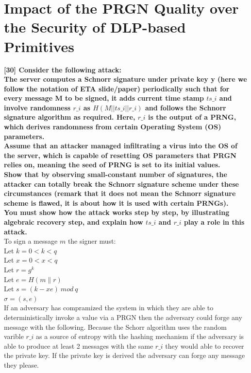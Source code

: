 \documentclass[letterpaper,11pt,notitlepage,fleqn]{article}
\begin{document}
\section{Impact of the PRGN Quality over the Security of DLP-based Primitives}
\noindent \textbf{[30] Consider the following attack:}\\ 
\textbf{The server computes a Schnorr signature under private key y (here we follow the notation of ETA slide/paper) periodically such that for every message M to be signed, it adds current time  stamp  $ts\_i$  and  involve  randomness  $r\_i$  as  $H(M||ts\_i||r\_i)$  and  follows  the  Schnorr signature  algorithm  as  required.  Here,  $r\_i$  is  the  output  of  a  PRNG,  which  derives randomness from certain Operating System (OS) parameters.}  \\
\textbf {Assume  that  an  attacker  managed  infiltrating  a  virus  into  the  OS  of  the  server,  which  is capable of resetting OS parameters that PRGN relies on, meaning the seed of PRNG is set to its initial values.} \\
\textbf{Show that by observing small-constant number of signatures, the attacker can totally break the Schnorr signature scheme under these circumstances (remark that it does not mean the Schnorr signature scheme is flawed, it is about how it is used with certain PRNGs).} \\
\textbf{You must show how the attack works step by step, by illustrating algebraic recovery step, and explain how $ts\_i$ and $r\_i$ play a role in this attack.}\\
To sign a message $m$ the signer must:\\
Let $k = 0 < k < q$ \\
Let $x = 0 < x < q$ \\
Let $r = g^k$ \\
Let $e = H(m \| r)$ \\
Let $s = (k - xe)\ mod\ q$ \\
$\sigma = (s,e)$ \\

If an adversary has compramized the system in which they are able to deterministically invoke a value via a PRGN then the adversary could forge any message with the following. Because the Schorr algorithm uses the random varible $r\_i$ as a source of entropy with the hashing mechanism if the adversary is able to produce at least 2 messages with the same $r\_i$ they would able to recover the private key. If the private key is derived the adversary can forge any message they please.
\end{document}
